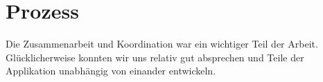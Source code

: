 \section{Prozess}
Die Zusammenarbeit und Koordination war ein wichtiger Teil der Arbeit. Glücklicherweise konnten wir uns relativ gut absprechen und Teile der Applikation unabhängig von einander entwickeln. 





